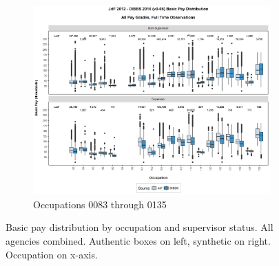 \documentclass[10pt, letterpaper]{article}
\begin{document}
\begin{spacing}{1.0}
\begin{figure}[h]
\begin{subfigure}{1\textwidth}
        \includegraphics[width=6in, trim={0 1in 0 0.75in}, clip]{JdFDIBBSBasicPaySupervisoryStatusOccupation21.png}
        \caption{Occupations 0083 through 0135}
        \vspace{10pt}
    \end{subfigure}
    \caption{Basic pay distribution by occupation and supervisor status.  All agencies combined.  Authentic boxes on left, synthetic on right.  Occupation on x-axis.}
    \label{figure:JdFDIBBSBasicPaySupervisoryStatusOccupation1}
\end{figure}

\clearpage


\end{spacing}
\end{document}
